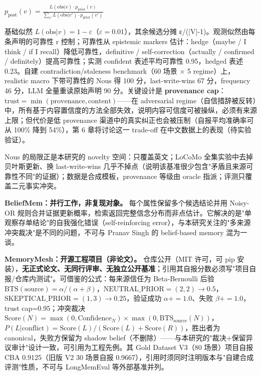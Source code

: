 \documentclass{article}
\begin{document}
$p_{\mathrm{post}}(v) = \frac{L(\mathrm{obs}|v)\cdot p_{\mathrm{prior}}(v)}{\sum_{v'} L(\mathrm{obs}|v')\cdot p_{\mathrm{prior}}(v')}$


基础似然 $L(\mathrm{obs}|v)=1-\varepsilon$（$\varepsilon=0.01$），其余候选分摊 ε/(|V|-1)。观测似然由每条声明的可靠性 r 控制；可靠性从 epistemic markers 估计：hedge（maybe / I think / if I recall）降低可靠性，definitive / self-correction（actually / confirmed / definitely）提高可靠性；实测 confident 表述平均可靠性 0.95，hedged 表述 0.23。自建 contradiction/staleness benchmark（60 场景 $\times$ 5 regime）上，realistic macro 下带可靠性的 Nous 得 100 分，last-write-wins 67 分，frequency 46 分，LLM 全量重读原始声明 90 分。关键设计是 \textbf{provenance cap}：$\mathrm{trust}=\min(\mathrm{provenance},\mathrm{content})$——在 adversarial regime（自信措辞被反转）中，所有基于内容置信度的方法全部失效，说明内容可信度可被操纵，必须有来源上限；但代价是低 provenance 渠道中的真实纠正也会被压制（自报平均准确率可从 100\% 降到 54\%），第 6 章将讨论这一 trade-off 在中文数据上的表现（待实验验证）。


Nous 的局限正是本研究的 novelty 空间：只覆盖英文；LoCoMo 全集实验中去掉贝叶斯更新、换 last-write-wins 几乎不掉点（说明该基准很少包含"矛盾且来源可靠性不同"的证据）；数据是合成模板，provenance 等级由 oracle 指派；评测只覆盖二元事实冲突。


\textbf{BeliefMem\citep{liao2026}：并行工作，非复现对象。} 每个属性保留多个候选结论并用 Noisy-OR 规则合并证据更新概率，检索返回完整信念分布而非点估计。它解决的是"单观察存单结论"的自我强化错误（self-reinforcing error），与本研究关注的"多来源冲突裁决"是不同的问题，不可与 Pranav Singh 的 belief-based memory 混为一谈。


\textbf{MemoryMesh：开源工程项目（非论文）。}\citep{memorymesh} 仓库公开（MIT 许可，可 pip 安装），\textbf{无正式论文、无同行评审、无独立公开基准}；引用其自报分数必须写"项目自报/仓库内测试"。可借鉴的公式：每来源信任为 Beta-Bernoulli 后验 $\mathrm{BTS}(\mathrm{source})=\alpha/(\alpha+\beta)$，$\mathrm{NEUTRAL\_PRIOR}=(2,2)\to 0.5$，$\mathrm{SKEPTICAL\_PRIOR}=(1,3)\to 0.25$，验证成功 $\alpha+=1.0$、失败 $\beta+=1.0$，trust cap=0.95；冲突裁决 $\mathrm{Score}(N)=\max(0,\mathrm{Confidence}_N)\times\max(0,\mathrm{BTS}_{\mathrm{source}}(N))$，$P(L|\mathrm{conflict})=\mathrm{Score}(L)/(\mathrm{Score}(L)+\mathrm{Score}(R))$，胜出者为 canonical，失败方保留为 shadow belief（不删除）——与本研究的"裁决+保留异议审计"设计一致，可引用为工程先例。其 Gold Dataset V3（80 场景）项目自报 CBA 0.9125（旧版 V2 30 场景自报 0.9667），引用时须同时注明版本与"自建合成评测"性质，不可与 LongMemEval 等外部基准并列。
\end{document}
